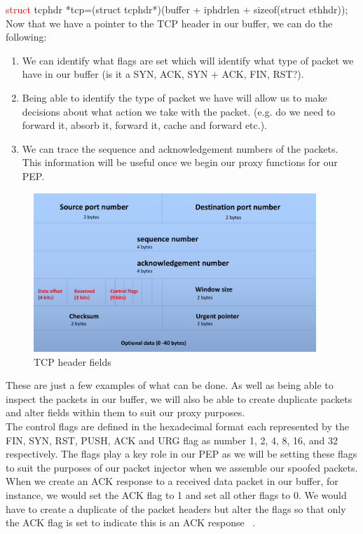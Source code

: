 \noindent \textcolor{red}{struct} tcphdr *tcp=(struct tcphdr*)(buffer + iphdrlen + sizeof(struct ethhdr)); \\

Now that we have a pointer to the TCP header in our buffer, we can do the following:\\

\begin{enumerate}
\item We can identify what flags are set which will identify what type of packet we have in our buffer (is it a SYN, ACK, SYN + ACK, FIN, RST?).
\item Being able to identify the type of packet we have will allow us to make decisions about what action we take with the packet. (e.g. do we need to forward it, absorb it, forward it, cache and forward etc.).
\item We can trace the sequence and acknowledgement numbers of the packets. This information will be useful once we begin our proxy functions for our PEP.\\
\end{enumerate}

\begin{figure}[h!]
    \centering
    \includegraphics[width=0.95\textwidth]{TCPHeaders.pdf}
    \caption{TCP header fields}
    \label{TCPHeader}     
\end{figure}

These are just a few examples of what can be done. As well as being able to inspect the packets in our buffer, we will also be able to create duplicate packets and alter fields within them to suit our proxy purposes. \\

The control flags are defined in the hexadecimal format each represented by the FIN, SYN, RST, PUSH, ACK and URG flag as number 1, 2, 4, 8, 16,  and 32 respectively. The flags play a key role in our PEP as we will be setting these flags to suit the purposes of our packet injector when we assemble our spoofed packets. When we create an ACK response to a received data packet in our buffer, for instance, we would set the ACK flag to 1 and set all other flags to 0. We would have to create a duplicate of the packet headers but alter the flags so that only the ACK flag is set to indicate this is an ACK response ~\cite{35}. \\

